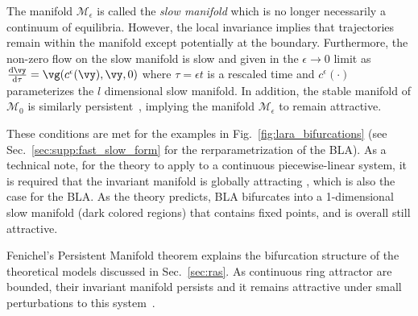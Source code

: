 \documentclass{article} %
\newcounter{ct}
\newcommand{\dm}[1]{\ensuremath{\mathrm{d}{#1}}} %
\newcommand{\RN}[2]{\frac{\dm{#1}}{\dm{#2}}} %
\newcommand{\manifold}{\mathcal{M}}
\theoremstyle{definition}
\theoremstyle{remark}
\renewcommand{\cite}{\citep}
\begin{document}
The manifold $\manifold_\epsilon$ is called the \emph{slow manifold} which is no longer necessarily a continuum of equilibria.
However, the local invariance implies that trajectories remain within the manifold except potentially at the boundary.
Furthermore, the non-zero flow on the slow manifold is slow and given in the $\epsilon \to 0$ limit as $\RN{\vy}{\tau} = \vg(c^\epsilon(\vy), \vy, 0)$ where $\tau = \epsilon t$ is a rescaled time and $c^\epsilon(\cdot)$ parameterizes the $l$ dimensional slow manifold.
In addition, the stable manifold of $\manifold_0$ is similarly  persistent~\cite{Jones1995}, implying the manifold $\manifold_\epsilon$ to remain attractive.


These conditions are met for the examples in Fig.~\ref{fig:lara_bifurcations} (see Sec.~\ref{sec:supp:fast_slow_form} for the rerparametrization of the BLA).
 As a technical note, for the theory to apply to a continuous piecewise-linear system, it is required that the invariant manifold is globally attracting \cite{simpson2018}, which is also the case for the BLA.
As the theory predicts, BLA bifurcates into a 1-dimensional slow manifold (dark colored regions) that contains fixed points, and is overall still attractive.

Fenichel's Persistent Manifold theorem explains the bifurcation structure of the theoretical models discussed in Sec.~\ref{sec:ras}.
As continuous ring attractor are bounded, their invariant manifold persists and it remains attractive under small perturbations to this system~\citep{wiggins1994}.

\end{document}
